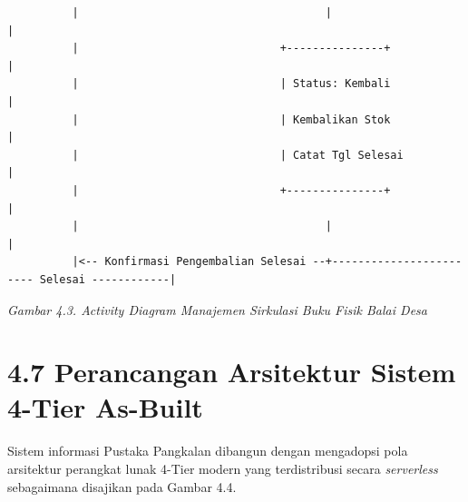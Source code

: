 \documentclass[
  indonesian,
  12pt,
]{report}
\begin{document}
\begin{verbatim}
          |                                      |                                             |
          |                               +---------------+                                    |
          |                               | Status: Kembali                                    |
          |                               | Kembalikan Stok                                    |
          |                               | Catat Tgl Selesai                                  |
          |                               +---------------+                                    |
          |                                      |                                             |
          |<-- Konfirmasi Pengembalian Selesai --+------------------------ Selesai ------------|
\end{verbatim}

\emph{Gambar 4.3. Activity Diagram Manajemen Sirkulasi Buku Fisik Balai
Desa}

\section{4.7 Perancangan Arsitektur Sistem 4-Tier
As-Built}\label{perancangan-arsitektur-sistem-4-tier-as-built}

Sistem informasi Pustaka Pangkalan dibangun dengan mengadopsi pola
arsitektur perangkat lunak 4-Tier modern yang terdistribusi secara
\emph{serverless} sebagaimana disajikan pada Gambar 4.4.
\end{document}
